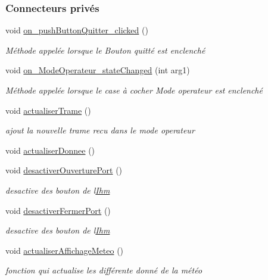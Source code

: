 \subsubsection*{Connecteurs privés}
\begin{DoxyCompactItemize}
\item 
void \hyperlink{class_ihm_ac5c16e4562308547603acc9ef76df570}{on\+\_\+push\+Button\+Quitter\+\_\+clicked} ()
\begin{DoxyCompactList}\small\item\em Méthode appelée lorsque le Bouton quitté est enclenché \end{DoxyCompactList}\item 
void \hyperlink{class_ihm_aeb9414496621bcc42dc63d3ad6e194f9}{on\+\_\+\+Mode\+Operateur\+\_\+state\+Changed} (int arg1)
\begin{DoxyCompactList}\small\item\em Méthode appelée lorsque le case à cocher Mode operateur est enclenché \end{DoxyCompactList}\item 
void \hyperlink{class_ihm_a94ea90d27fc0aa7598cf270dd3be98eb}{actualiser\+Trame} ()
\begin{DoxyCompactList}\small\item\em ajout la nouvelle trame recu dans le mode operateur \end{DoxyCompactList}\item 
void \hyperlink{class_ihm_a7c0a160f30e11a4f8d56b174e07566fe}{actualiser\+Donnee} ()
\item 
void \hyperlink{class_ihm_ab0a18639faa9f2c0b2a141321be4b973}{desactiver\+Ouverture\+Port} ()
\begin{DoxyCompactList}\small\item\em desactive des bouton de l\textquotesingle{}\hyperlink{class_ihm}{Ihm} \end{DoxyCompactList}\item 
void \hyperlink{class_ihm_a6a9bb865ffa3baf686ce16f11f69c57f}{desactiver\+Fermer\+Port} ()
\begin{DoxyCompactList}\small\item\em desactive des bouton de l\textquotesingle{}\hyperlink{class_ihm}{Ihm} \end{DoxyCompactList}\item 
void \hyperlink{class_ihm_a65487c8229375ff72290bed145876737}{actualiser\+Affichage\+Meteo} ()
\begin{DoxyCompactList}\small\item\em fonction qui actualise les différente donné de la météo \end{DoxyCompactList}\item 

\end{DoxyCompactItemize}
